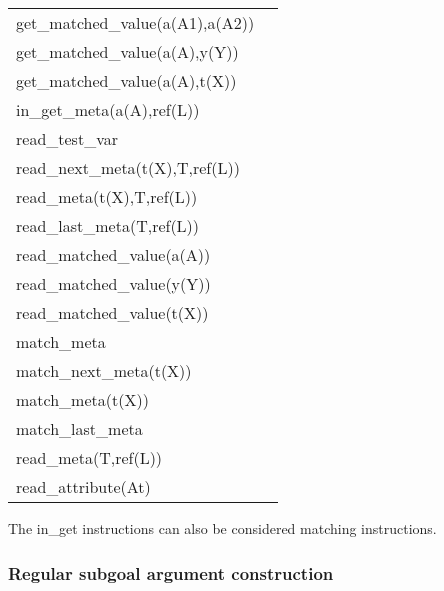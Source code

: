 \begin{tabular}{|l|l|}
\hline
get_matched_value(a(A1),a(A2))  &                         \\
get_matched_value(a(A),y(Y))    &                         \\
get_matched_value(a(A),t(X))    &                         \\
in_get_meta(a(A),ref(L))        &                         \\
\hline
read_test_var                   &         \\
read_next_meta(t(X),T,ref(L))   &                         \\
read_meta(t(X),T,ref(L))        &                         \\
read_last_meta(T,ref(L))        &                         \\
read_matched_value(a(A))        &                         \\
read_matched_value(y(Y))        &                         \\
read_matched_value(t(X))        &                         \\
match_meta                      &         \\
match_next_meta(t(X))           &                 \\
match_meta(t(X))                &                 \\
match_last_meta                 &         \\
read_meta(T,ref(L))             &                 \\
read_attribute(At)              &                 \\
\hline
\end{tabular}

The in_get instructions can also be considered matching instructions.


\subsubsection{Regular subgoal argument construction}

